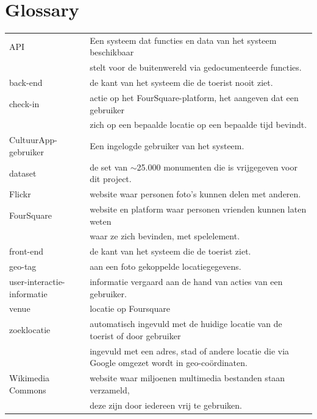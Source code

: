 \documentclass[a4paper,10pt]{article}
\newcommand{\rsection}[1]{
\section{#1}\label{sec:#1}
}
\begin{document}
	\clearpage
	\rsection{Glossary}
		\begin{tabular}{ l | l }
		API & Een systeem dat functies en data van het systeem beschikbaar  \\
			& stelt voor de buitenwereld via gedocumenteerde functies.\\
		back-end & de kant van het systeem die de toerist nooit ziet.\\
		check-in& actie op het FourSquare-platform, het aangeven dat een gebruiker  \\
			& zich op een bepaalde locatie op een bepaalde tijd bevindt.\\
		CultuurApp-gebruiker & Een ingelogde gebruiker van het systeem.\\
		dataset & de set van $\sim$25.000 monumenten die is vrijgegeven voor dit project.\\
		Flickr & website waar personen foto's kunnen delen met anderen.\\
		FourSquare& website en platform waar personen vrienden kunnen laten weten \\
			& waar ze zich bevinden, met spelelement.\\
		front-end & de kant van het systeem die de toerist ziet.\\
		geo-tag & aan een foto gekoppelde locatiegegevens.\\
		user-interactie-informatie& informatie vergaard aan de hand van acties van een gebruiker.\\
		venue & locatie op Foursquare\\
		zoeklocatie & automatisch ingevuld met de huidige locatie van de toerist of door gebruiker\\
& ingevuld met een adres, stad of andere locatie die via Google omgezet wordt in geo-co\"ordinaten.\\
		Wikimedia Commons & website waar miljoenen multimedia bestanden staan verzameld, \\
			& deze zijn door iedereen vrij te gebruiken.\\
		\end{tabular}
\end{document}
